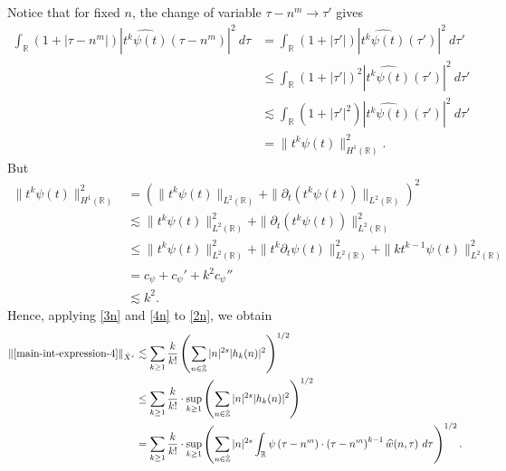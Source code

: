 \documentclass[12pt,reqno]{amsart}
\numberwithin{equation}{section}  %
\numberwithin{figure}{section}
\newcommand{\rr}{\mathbb{R}}
\newcommand{\zz}{\mathbb{Z}}
\newcommand{\zzdot}{\dot{\zz}}
\newcommand{\wh}{\widehat}
\newcommand{\p}{\partial}
\theoremstyle{plain}
\theoremstyle{definition}
\theoremstyle{remark}
\begin{document}
%
%
Notice that for fixed $n$, the change of variable $\tau - n^{m } \to \tau'$
gives
%
%
\begin{equation}
	\label{3n}
	\begin{split}
		\int_\rr \left( 1 + | \tau - n^{m } | \right) | \wh{t^{k}
		\psi(t)}\left( \tau - n^{m } \right) |^2 \ d \tau
		& = \int_\rr \left( 1 + |\tau'| \right) | \wh{t^k \psi(t)}(\tau') |^2 \
		d \tau'
		\\
		& \le \int_\rr \left( 1 + |\tau'| \right)^2 | \wh{t^k \psi(t)}(\tau')
		|^2 \ d \tau'
		\\
		& \lesssim \int_\rr \left( 1 + | \tau' |^2 \right) | \wh{t^{k}
		\psi(t)}(\tau') |^2 \ d \tau'
		\\
		& = \|t^k \psi(t) \|_{H^1(\rr)}^2.
	\end{split}
\end{equation}
%
%
But
%
%
\begin{equation}
	\label{4n}
	\begin{split}
		\|t^k \psi(t) \|_{H^1(\rr)}^2
		& = \left( \|t^k \psi(t)\|_{L^2(\rr)} + \|\p_t \left( t^k \psi(t)
		\right)\|_{L^2(\rr)} \right)^2
		\\
		& \lesssim \|t^{k}\psi(t) \|_{L^2(\rr)}^2 + \|\p_t \left (t^{k}
		\psi(t) \right )\|_{L^2(\rr)}^2
		\\
		& \le \|t^k \psi(t) \|_{L^2(\rr)}^2 + \|t^k \p_t \psi(t)
		\|_{L^2(\rr)}^2 + \|k t^{k -1} \psi(t) \|_{L^2(\rr)}^2
		\\
		& = c_{\psi} + c_{\psi}' + k^2 c_{\psi}''
		\\
		& \lesssim k^2.
	\end{split}
\end{equation}
%
%
Hence, applying \eqref{3n} and \eqref{4n} to \eqref{2n}, we obtain
%
\begin{equation}
	\label{5n}
	\begin{split}
		\|\eqref{main-int-expression-4} \|_{\dot{X}^s}
		& \lesssim
		\sum_{k \ge 1} \frac{k}{k!} \left( \sum_{n \in \zzdot} |n|^{2s} | h_k(n) |^2 
		\right)^{1/2}
		\\
		& \le \sum_{k \ge 1} \frac{k}{k!}
		\cdot \sup_{k \ge 1} \left( \sum_{n \in \zzdot} |n|^{2s} | 
		h_k(n) |^2 \right)^{1/2}
		\\
		& = \sum_{k \ge 1} \frac{k}{k!} \cdot \sup_{k \ge 1} 
		\left( \sum_{n \in \zzdot} |n|^{2s} \int_\rr 
		\psi\left( \tau - n^{m } \right) \cdot \left( \tau - n^{m } 
		\right)^{k -1} \wh{w}(n, \tau) \ d \tau \right)^{1/2}.
	\end{split}
\end{equation}
\end{document}
